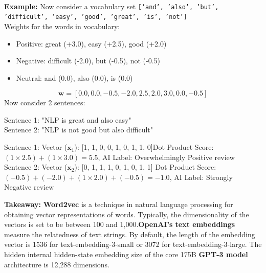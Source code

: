 \documentclass[DIV=20,oneside]{scrartcl}
\newcommand{\takeaway}[1]{%
	\begin{tcolorbox}[
		colback=black!20,
		colframe=black,
		boxrule=0.5pt,
		arc=2mm]
		\textbf{Takeaway: } #1
	\end{tcolorbox}
}
\newcommand{\example}{
	\noindent\textbf{\\Example: }
}
\begin{document}
	\example Now consider a vocabulary set \texttt{['and', 'also', 'but', 'difficult', 'easy', 'good', 'great', 'is', 'not']}\\
	Weights for the words in vocabulary:
	\begin{itemize}[itemsep=0.5pt, topsep=1pt]
		\item Positive: great (+3.0), easy (+2.5), good (+2.0)
		\item Negative: difficult (-2.0), but (-0.5), not (-0.5)
		\item Neutral: and (0.0), also (0.0), is (0.0)
	\end{itemize}
	
	$$\mathbf{w} = [0.0, 0.0, -0.5, -2.0, 2.5, 2.0, 3.0, 0.0, -0.5]$$
	Now consider 2 sentences:
	\begin{center}
		Sentence 1: "NLP is great and also easy"\\
		Sentence 2: "NLP is not good but also difficult"
	\end{center}
	Sentence 1: Vector ($\mathbf{x}_1$): [1, 1, 0, 0, 1, 0, 1, 1, 0]\quad \quad 	Dot Product Score: $(1 \times 2.5) + (1 \times 3.0) = \mathbf{5.5}$, AI Label: Overwhelmingly Positive review\\
	Sentence 2: Vector ($\mathbf{x}_2$): [0, 1, 1, 1, 0, 1, 0, 1, 1]\quad \quad 
	Dot Product Score: $(-0.5) + (-2.0) + (1 \times 2.0) + (-0.5) = \mathbf{-1.0}$,
	AI Label: Strongly Negative review
	
	\takeaway{\textbf{Word2vec} is a technique in natural language processing for obtaining vector representations of words. Typically, the dimensionality of the vectors is set to be between 100 and 1,000.\textbf{OpenAI’s text embeddings} measure the relatedness of text strings. By default, the length of the embedding vector is 1536 for text-embedding-3-small or 3072 for text-embedding-3-large. The hidden internal hidden-state embedding size of the core 175B \textbf{GPT-3 model} architecture is 12,288 dimensions. }
	
\end{document}
